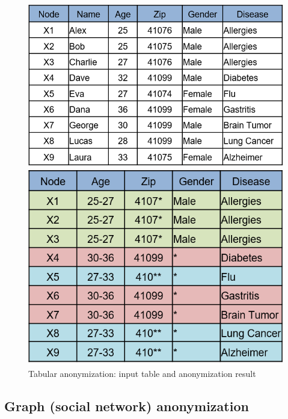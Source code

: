 \documentclass{llncs}
\begin{document}
\begin{figure}[!t]
	\centering
	\begin{minipage}[b]{0.5\textwidth}
		\includegraphics[width=\textwidth]{figures/anonym/k_anon_input}
	\end{minipage}
	\hfill
	\begin{minipage}[b]{0.418\textwidth}
		\includegraphics[width=\textwidth]{figures/anonym/k_anon_output}
	\end{minipage}
	\caption{Tabular anonymization: input table and anonymization result}
	\label{fig:anonymized_clusters}
\end{figure}


\subsection{Graph (social network) anonymization}
\label{ssect:graph_sn_anon}
\end{document}
